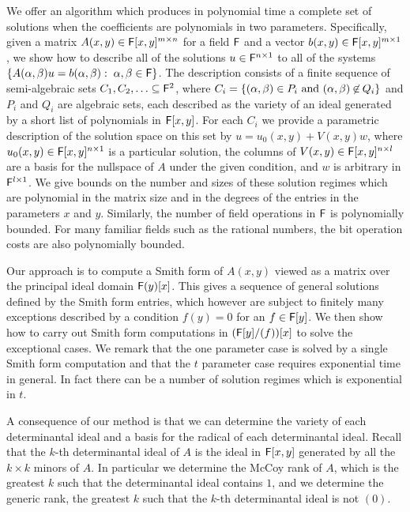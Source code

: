 We offer an algorithm which produces in polynomial time a complete set
of solutions when the coefficients are polynomials in two parameters.
Specifically, given a matrix $A(x,y)\in{\mathsf F}[x,y]^{m\times n}$ for a field ${\mathsf F}$
and a vector $b(x,y)\in{\mathsf F}[x,y]^{m\times 1}$, we show how to describe all of
the solutions $u \in {\mathsf F}^{n\times 1}$ to all of the systems
$\{ A(\alpha, \beta)u = b(\alpha, \beta):\; \alpha,\beta\in{\mathsf F}\}$.
%
The description consists of a finite sequence of semi-algebraic sets
$C_1,C_2,\ldots\subseteq{\mathsf F}^2$, where
$
C_i = \left\{ (\alpha,\beta)\in P_i ~\hbox{and}~ 
              (\alpha,\beta){\mathrel{\hbox{$\mskip4mu\not\in\mskip4mu$}}} Q_i \right\}
$
and $P_i$ and $Q_i$ are algebraic sets, each described as the variety
of an ideal generated by a short list of polynomials in ${\mathsf F}[x,y]$.
For each $C_i$ we provide a parametric description of the solution
space on this set by
$u = u_0(x,y) + V(x,y)w$, where $u_0(x,y) \in {\mathsf F}[x,y]^{n\times 1}$ is a particular
solution, the columns of $V(x,y) \in {\mathsf F}[x,y]^{n\times l}$ are a basis
for the nullspace of $A$ under the given condition, and $w$ is
arbitrary in ${\mathsf F}^{l\times 1}$. 
%
We give bounds on the number and sizes of these solution regimes
which are polynomial in the matrix size and in the degrees of the
entries in the parameters $x$ and $y$.  Similarly, the number of field
operations in ${\mathsf F}$ is polynomially bounded.  For many familiar fields
such as the rational numbers, the bit operation costs are also
polynomially bounded.
 
Our approach is to compute a Smith form of $A(x,y)$ viewed as a matrix
over the principal ideal domain ${\mathsf F}(y)[x]$.  This gives a sequence of
general solutions defined by the Smith form entries, which however are
subject to finitely many exceptions described by a condition 
$f(y) = 0$ for an $f\in{\mathsf F}[y]$.  We then show how to carry out Smith form
computations in $({\mathsf F}[y]/(f))[x]$ to solve the exceptional cases.  We
remark that the one parameter case is solved by a single Smith form
computation and that the $t$ parameter case requires exponential time
in general.  In fact there can be a number of solution regimes which
is exponential in $t$.

A consequence of our method is that we can determine the variety of
each determinantal ideal and a basis for the radical of each
determinantal ideal.  Recall that the $k$-th determinantal ideal of
$A$ is the ideal in ${\mathsf F}[x,y]$ generated by all the $k \times k$ minors
of $A$.  In particular we determine the McCoy rank of $A$, which is
the greatest $k$ such that the determinantal ideal contains $1$, and
we determine the generic rank, the greatest $k$ such that the $k$-th
determinantal ideal is not $(0)$.




